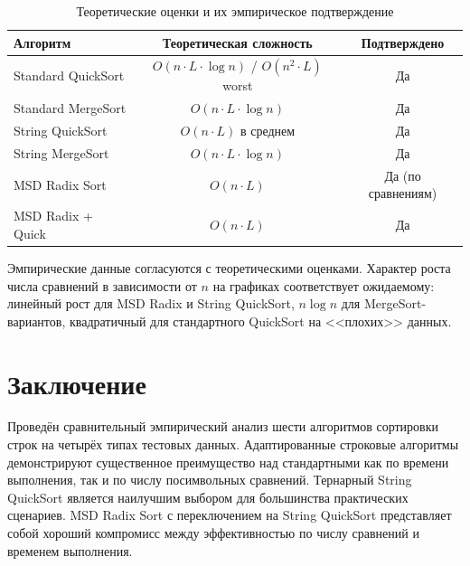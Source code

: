 \documentclass[12pt,a4paper]{article}
\begin{document}
\begin{table}[H]
\centering
\begin{tabular}{lcc}
\toprule
\textbf{Алгоритм} & \textbf{Теоретическая сложность} & \textbf{Подтверждено} \\
\midrule
Standard QuickSort  & $O(n \cdot L \cdot \log n)$ / $O(n^2 \cdot L)$ worst & Да \\
Standard MergeSort  & $O(n \cdot L \cdot \log n)$                            & Да \\
String QuickSort    & $O(n \cdot L)$ в среднем                               & Да \\
String MergeSort    & $O(n \cdot L \cdot \log n)$                            & Да \\
MSD Radix Sort      & $O(n \cdot L)$                                          & Да (по сравнениям) \\
MSD Radix + Quick   & $O(n \cdot L)$                                          & Да \\
\bottomrule
\end{tabular}
\caption{Теоретические оценки и их эмпирическое подтверждение}
\end{table}

Эмпирические данные согласуются с теоретическими оценками. Характер роста числа сравнений в зависимости от $n$ на графиках соответствует ожидаемому: линейный рост для MSD Radix и String QuickSort, $n \log n$ для MergeSort-вариантов, квадратичный для стандартного QuickSort на <<плохих>> данных.


\section*{Заключение}

Проведён сравнительный эмпирический анализ шести алгоритмов сортировки строк на четырёх типах тестовых данных. Адаптированные строковые алгоритмы демонстрируют существенное преимущество над стандартными как по времени выполнения, так и по числу посимвольных сравнений. Тернарный String QuickSort является наилучшим выбором для большинства практических сценариев. MSD Radix Sort с переключением на String QuickSort представляет собой хороший компромисс между эффективностью по числу сравнений и временем выполнения.

\end{document}
